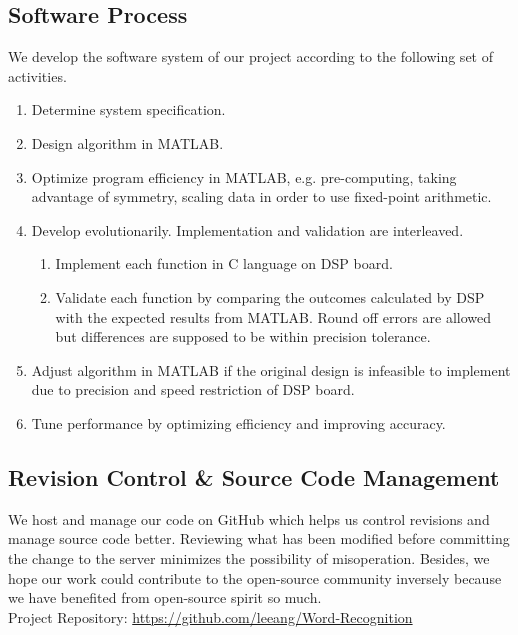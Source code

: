\subsection{Software Process}
We develop the software system of our project according to the following set of activities.
\begin{enumerate}
\item Determine system specification.
\item Design algorithm in MATLAB.
\item Optimize program efficiency in MATLAB, e.g. pre-computing, taking advantage of symmetry, scaling data in order to use fixed-point arithmetic.
\item Develop evolutionarily. Implementation and validation are interleaved.
\begin{enumerate}
	\item Implement each function in C language on DSP board.
	\item Validate each function by comparing the outcomes calculated by DSP with the expected results from MATLAB. Round off errors are allowed but differences are supposed to be within precision tolerance.
\end{enumerate}
\item Adjust algorithm in MATLAB if the original design is infeasible to implement due to precision and speed restriction of DSP board.
\item Tune performance by optimizing efficiency and improving accuracy.
\end{enumerate}


\subsection{Revision Control \& Source Code Management}

We host and manage our code on GitHub which helps us control revisions and manage source code better. Reviewing what has been modified before committing the change to the server minimizes the possibility of misoperation. Besides, we hope our work could contribute to the open-source community inversely because we have benefited from open-source spirit so much.\\

Project Repository: \url{https://github.com/leeang/Word-Recognition}


